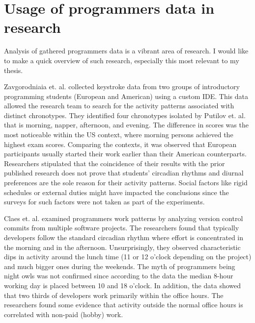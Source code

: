 \section{Usage of programmers data in research}

Analysis of gathered programmers data is a vibrant area of research. I would like to make a quick overview of such research, especially this most relevant to my thesis.

Zavgorodniaia et. al. \cite{Zav21MorningEvening} collected keystroke data from two groups of introductory programming students (European and American) using a custom IDE. This data allowed the research team to search for the activity patterns associated with distinct chronotypes. They identified four chronotypes isolated by Putilov et. al. \cite{Put19FourChronotypes} that is morning, napper, afternoon, and evening. The difference in scores was the most noticeable within the US context, where morning persons achieved the highest exam scores. Comparing the contexts, it was observed that European participants usually started their work earlier than their American counterparts. Researchers stipulated that the coincidence of their results with the prior published research does not prove that students’ circadian rhythms and diurnal preferences are the sole reason for their activity patterns. Social factors like rigid schedules or external duties might have impacted the conclusions since the surveys for such factors were not taken as part of the experiments.

Claes et. al. \cite{Cla18NightWeekend} examined programmers work patterns by analyzing version control commits from multiple software projects. The researchers found that typically developers follow the standard circadian rhythm where effort is concentrated in the morning and in the afternoon. Unsurprisingly, they observed characteristic dips in activity around the lunch time (11 or 12 o'clock depending on the project) and much bigger ones during the weekends. The myth of programmers being night owls was not confirmed since according to the data the median 8-hour working day is placed between 10 and 18 o'clock. In addition, the data showed that two thirds of developers work primarily within the office hours. The researchers found some evidence that activity outside the normal office hours is correlated with non-paid (hobby) work.

